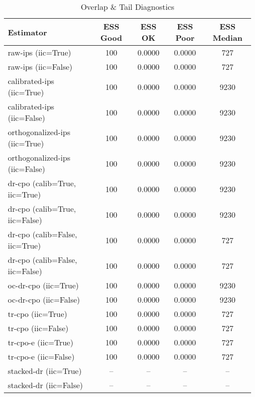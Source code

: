 \begin{table}[htbp]
\centering
\caption{Overlap & Tail Diagnostics}
\label{tab:A3}
\begin{tabular}{l|cccc}
\toprule
Estimator & ESS Good & ESS OK & ESS Poor & ESS Median \\
\midrule
raw-ips (iic=True) & 100 & 0.0000 & 0.0000 & 727 \\
raw-ips (iic=False) & 100 & 0.0000 & 0.0000 & 727 \\
calibrated-ips (iic=True) & 100 & 0.0000 & 0.0000 & 9230 \\
calibrated-ips (iic=False) & 100 & 0.0000 & 0.0000 & 9230 \\
orthogonalized-ips (iic=True) & 100 & 0.0000 & 0.0000 & 9230 \\
orthogonalized-ips (iic=False) & 100 & 0.0000 & 0.0000 & 9230 \\
dr-cpo (calib=True, iic=True) & 100 & 0.0000 & 0.0000 & 9230 \\
dr-cpo (calib=True, iic=False) & 100 & 0.0000 & 0.0000 & 9230 \\
dr-cpo (calib=False, iic=True) & 100 & 0.0000 & 0.0000 & 727 \\
dr-cpo (calib=False, iic=False) & 100 & 0.0000 & 0.0000 & 727 \\
oc-dr-cpo (iic=True) & 100 & 0.0000 & 0.0000 & 9230 \\
oc-dr-cpo (iic=False) & 100 & 0.0000 & 0.0000 & 9230 \\
tr-cpo (iic=True) & 100 & 0.0000 & 0.0000 & 727 \\
tr-cpo (iic=False) & 100 & 0.0000 & 0.0000 & 727 \\
tr-cpo-e (iic=True) & 100 & 0.0000 & 0.0000 & 727 \\
tr-cpo-e (iic=False) & 100 & 0.0000 & 0.0000 & 727 \\
stacked-dr (iic=True) & -- & -- & -- & -- \\
stacked-dr (iic=False) & -- & -- & -- & -- \\
\bottomrule
\end{tabular}
\end{table}